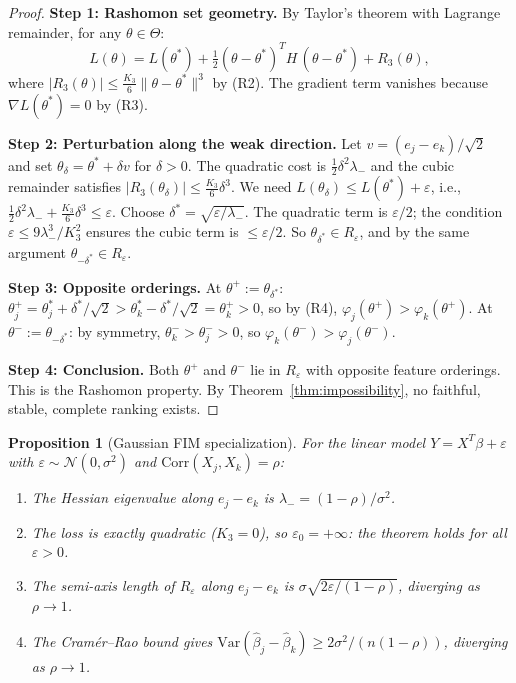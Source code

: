 \documentclass{article}
\newtheorem{proposition}[theorem]{Proposition}
\newcommand{\Var}{\mathrm{Var}}
\begin{document}
\begin{proof}
\textbf{Step 1: Rashomon set geometry.}
By Taylor's theorem with Lagrange remainder, for any $\theta \in \Theta$:
\[
    L(\theta) = L(\theta^*) + \tfrac{1}{2}(\theta - \theta^*)^T H\, (\theta - \theta^*) + R_3(\theta),
\]
where $|R_3(\theta)| \leq \frac{K_3}{6}\|\theta - \theta^*\|^3$ by (R2). The gradient term vanishes because $\nabla L(\theta^*) = 0$ by (R3).

\textbf{Step 2: Perturbation along the weak direction.}
Let $v = (e_j - e_k)/\sqrt{2}$ and set $\theta_\delta = \theta^* + \delta v$ for $\delta > 0$. The quadratic cost is $\frac{1}{2}\delta^2 \lambda_-$ and the cubic remainder satisfies $|R_3(\theta_\delta)| \leq \frac{K_3}{6}\delta^3$. We need $L(\theta_\delta) \leq L(\theta^*) + \varepsilon$, i.e., $\frac{1}{2}\delta^2 \lambda_- + \frac{K_3}{6}\delta^3 \leq \varepsilon$. Choose $\delta^* = \sqrt{\varepsilon/\lambda_-}$. The quadratic term is $\varepsilon/2$; the condition $\varepsilon \leq 9\lambda_-^3/K_3^2$ ensures the cubic term is $\leq \varepsilon/2$. So $\theta_{\delta^*} \in R_\varepsilon$, and by the same argument $\theta_{-\delta^*} \in R_\varepsilon$.

\textbf{Step 3: Opposite orderings.}
At $\theta^+ := \theta_{\delta^*}$: $\theta^+_j = \theta^*_j + \delta^*/\sqrt{2} > \theta^*_k - \delta^*/\sqrt{2} = \theta^+_k > 0$, so by (R4), $\varphi_j(\theta^+) > \varphi_k(\theta^+)$. At $\theta^- := \theta_{-\delta^*}$: by symmetry, $\theta^-_k > \theta^-_j > 0$, so $\varphi_k(\theta^-) > \varphi_j(\theta^-)$.

\textbf{Step 4: Conclusion.}
Both $\theta^+$ and $\theta^-$ lie in $R_\varepsilon$ with opposite feature orderings. This is the Rashomon property. By Theorem~\ref{thm:impossibility}, no faithful, stable, complete ranking exists.
\end{proof}

\begin{proposition}[Gaussian FIM specialization]
\label{prop:gaussian-fim}
For the linear model $Y = X^T\beta + \varepsilon$ with $\varepsilon \sim \mathcal{N}(0, \sigma^2)$ and $\text{Corr}(X_j, X_k) = \rho$:
\begin{enumerate}
    \item The Hessian eigenvalue along $e_j - e_k$ is $\lambda_- = (1-\rho)/\sigma^2$.
    \item The loss is exactly quadratic ($K_3 = 0$), so $\varepsilon_0 = +\infty$: the theorem holds for \emph{all} $\varepsilon > 0$.
    \item The semi-axis length of $R_\varepsilon$ along $e_j - e_k$ is $\sigma\sqrt{2\varepsilon/(1-\rho)}$, diverging as $\rho \to 1$.
    \item The Cram\'er--Rao bound gives $\Var(\hat\beta_j - \hat\beta_k) \geq 2\sigma^2/(n(1-\rho))$, diverging as $\rho \to 1$.
\end{enumerate}
\end{proposition}
\end{document}
